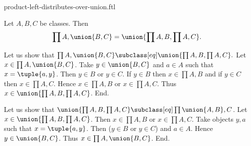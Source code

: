 \documentclass{article}
\begin{document}
\begin{smodule}[creators={Marcel Schütz}]{product-left-distributes-over-union.ftl}

  \begin{fproposition*}[label=3478802032230400]
    Let $A, B, C$ be classes.
    Then \[\prod{A,\union{B,C}} = \union{\prod{A,B},\prod{A,C}}.\]
  \end{fproposition*}
  \begin{fproof}
    Let us show that $\prod{A,\union{B,C}} \subclass[eq] \union{\prod{A,B},\prod{A,C}}.$
      Let $x \in \prod{A,\union{B,C}}$.
      Take $y \in \union{B,C}$ and $a \in A$ such that $x = \tuple{a,y}$.
      Then $y \in B$ or $y \in C$.
      If $y \in B$ then $x \in \prod{A,B}$ and if $y \in C$ then $x \in \prod{A,C}$.
      Hence $x \in \prod{A,B}$ or $x \in \prod{A,C}$.
      Thus $x \in \union{\prod{A,B},\prod{A,C}}$.
    End.

    Let us show that $\union{\prod{A,B},\prod{A,C}} \subclass[eq]
    \prod{\union{A,B},C}$.
      Let $x \in \union{\prod{A,B},\prod{A,C}}$.
      Then $x \in \prod{A,B}$ or $x \in \prod{A,C}$.
      Take objects $y, a$ such that $x = \tuple{a,y}$.
      Then ($y \in B$ or $y \in C$) and $a \in A$.
      Hence $y \in \union{B,C}$.
      Thus $x \in \prod{A,\union{B,C}}$.
    End.
  \end{fproof}
\end{smodule}
\end{document}
